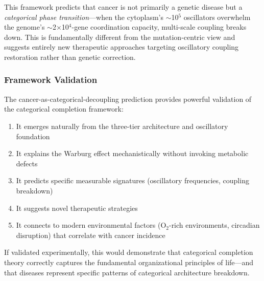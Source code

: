 \documentclass[11pt]{article}
\begin{document}
This framework predicts that cancer is not primarily a genetic disease but a \textit{categorical phase transition}—when the cytoplasm's $\sim$10$^5$ oscillators overwhelm the genome's $\sim$2$\times$10$^4$-gene coordination capacity, multi-scale coupling breaks down. This is fundamentally different from the mutation-centric view and suggests entirely new therapeutic approaches targeting oscillatory coupling restoration rather than genetic correction.

\subsubsection{Framework Validation}

The cancer-as-categorical-decoupling prediction provides powerful validation of the categorical completion framework:
\begin{enumerate}
\item It emerges naturally from the three-tier architecture and oscillatory foundation
\item It explains the Warburg effect mechanistically without invoking metabolic defects
\item It predicts specific measurable signatures (oscillatory frequencies, coupling breakdown)
\item It suggests novel therapeutic strategies
\item It connects to modern environmental factors (O$_2$-rich environments, circadian disruption) that correlate with cancer incidence
\end{enumerate}

If validated experimentally, this would demonstrate that categorical completion theory correctly captures the fundamental organizational principles of life—and that diseases represent specific patterns of categorical architecture breakdown.
\end{document}
